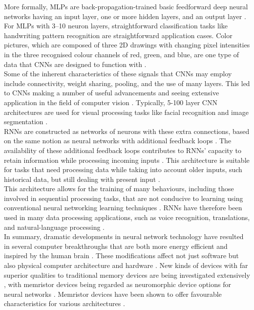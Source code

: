 \noindent More formally, MLPs are back-propagation-trained basic feedforward deep neural networks having an input layer, one or more hidden layers, and an output layer \cite{pelaez2014ischemia}. For MLPs with 3–10 neuron layers, straightforward classification tasks like handwriting pattern recognition are straightforward application cases.  Color pictures, which are composed of three 2D drawings with changing pixel intensities in the three recognised colour channels of red, green, and blue, are one type of data that CNNs are designed to function with \cite{matsugu2003subject}. \\

\noindent Some of the inherent characteristics of these signals that CNNs may employ include connectivity, weight sharing, pooling, and the use of many layers. This led to CNNs making a number of useful advancements and seeing extensive application in the field of computer vision \cite{ji20123d}. Typically, 5-100 layer CNN architectures are used for visual processing tasks like facial recognition and image segmentation \cite{szegedy2017inception}. \\

\noindent RNNs are constructed as networks of neurons with these extra connections, based on the same notion as neural networks with additional feedback loops \cite{funahashi1993approximation}. The availability of these additional feedback loops contributes to RNNs' capacity to retain information while processing incoming inputs \cite{lukovsevivcius2009reservoir}. This architecture is suitable for tasks that need processing data while taking into account older inputs, such historical data, but still dealing with present input \cite{mikolov2011extensions}. \\

\noindent This architecture allows for the training of many behaviours, including those involved in sequential processing tasks, that are not conducive to learning using conventional neural networking learning techniques \cite{zhang2005design}. RNNs have therefore been used in many data processing applications, such as voice recognition, translations, and natural-language processing \cite{hardy2018encoding}. \\

\noindent In summary, dramatic developments in neural network technology have resulted in several computer breakthroughs that are both more energy efficient and inspired by the human brain \cite{maass1997networks}. These modifications affect not just software but also physical computer architecture and hardware \cite{goodman2008brian}. New kinds of devices with far superior qualities to traditional memory devices are being investigated extensively \cite{nageswaran2009configurable}, with memristor devices being regarded as neuromorphic device options for neural networks \cite{kasabov2014neucube}. Memristor devices have been shown to offer favourable characteristics for various architectures \cite{querlioz2013immunity}.

